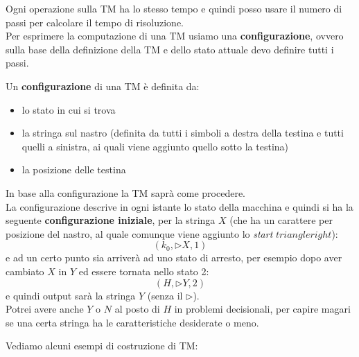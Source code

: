 \documentclass[a4paper,12pt, oneside]{book}
\begin{document}
Ogni operazione sulla TM ha lo stesso tempo e quindi posso usare il numero di
passi per calcolare il tempo di risoluzione.\\
Per esprimere la computazione di una TM usiamo una \textbf{configurazione},
ovvero sulla base della definizione della TM e dello stato attuale devo
definire tutti i passi.
\begin{definizione}
  Un \textbf{configurazione} di una TM è definita da:
  \begin{itemize}
    \item lo stato in cui si trova
    \item la stringa sul nastro (definita da tutti i simboli a destra della
    testina e tutti quelli a sinistra, ai quali viene aggiunto quello sotto la
    testina)
    \item la posizione delle testina 
  \end{itemize}
  In base alla configurazione la TM saprà come procedere.\\
  La configurazione descrive in ogni istante lo stato della macchina e quindi si
  ha la seguente \textbf{configurazione iniziale}, per la stringa $X$ (che ha un
  carattere per posizione del nastro, al quale comunque viene aggiunto lo
  \textit{start} $triangleright$):
  \[(k_0,\triangleright X, 1)\]
  e ad un certo punto sia arriverà ad uno stato di arresto, per esempio dopo
  aver cambiato $X$ in $Y$ ed essere tornata nello stato 2:
  \[(H,\triangleright Y, 2)\]
  e quindi output sarà la stringa $Y$ (senza il $\triangleright$).\\
  Potrei avere anche $Y$ o $N$ al posto di $H$ in problemi decisionali, per
  capire magari se una certa stringa ha le caratteristiche desiderate o meno.
\end{definizione}
Vediamo alcuni esempi di costruzione di TM:
\end{document}
